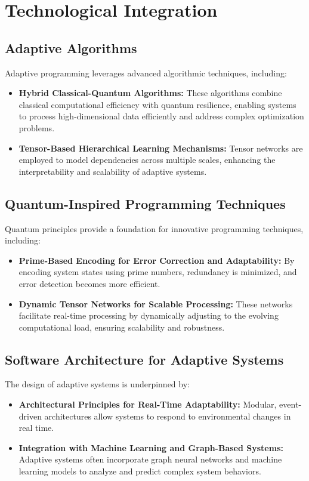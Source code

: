 \documentclass{article}
\theoremstyle{plain}
\begin{document}
\section{Technological Integration}

\subsection{Adaptive Algorithms}

Adaptive programming leverages advanced algorithmic techniques, including:
\begin{itemize}
    \item \textbf{Hybrid Classical-Quantum Algorithms:} These algorithms combine classical computational efficiency with quantum resilience, enabling systems to process high-dimensional data efficiently and address complex optimization problems.
    \item \textbf{Tensor-Based Hierarchical Learning Mechanisms:} Tensor networks are employed to model dependencies across multiple scales, enhancing the interpretability and scalability of adaptive systems.
\end{itemize}

\subsection{Quantum-Inspired Programming Techniques}

Quantum principles provide a foundation for innovative programming techniques, including:
\begin{itemize}
    \item \textbf{Prime-Based Encoding for Error Correction and Adaptability:} By encoding system states using prime numbers, redundancy is minimized, and error detection becomes more efficient\cite{farhi2014quantum}.
    \item \textbf{Dynamic Tensor Networks for Scalable Processing:} These networks facilitate real-time processing by dynamically adjusting to the evolving computational load, ensuring scalability and robustness\cite{arute2019quantum}.
\end{itemize}

\subsection{Software Architecture for Adaptive Systems}

The design of adaptive systems is underpinned by:
\begin{itemize}
    \item \textbf{Architectural Principles for Real-Time Adaptability:} Modular, event-driven architectures allow systems to respond to environmental changes in real time\cite{preskill2018quantum}.
    \item \textbf{Integration with Machine Learning and Graph-Based Systems:} Adaptive systems often incorporate graph neural networks and machine learning models to analyze and predict complex system behaviors\cite{schuld2019supervised}.
\end{itemize}
\end{document}
